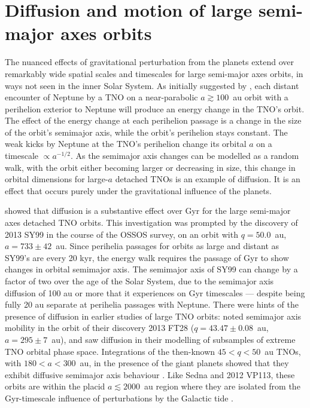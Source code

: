 \documentclass{aastex62}
\begin{document}
\section{Diffusion and motion of large semi-major axes orbits} \label{sec:diffusion}

The nuanced effects of gravitational perturbation from the planets extend over remarkably wide spatial scales and timescales for large semi-major axes orbits, in ways not seen in the inner Solar System.
As initially suggested by \citet{Duncan1987}, each distant encounter of Neptune by a TNO on a near-parabolic $a \gtrsim 100$~au orbit with a perihelion exterior to Neptune will produce an energy change in the TNO's orbit. 
The effect of the energy change at each perihelion passage is a change in the size of the orbit's semimajor axis, while the orbit's perihelion stays constant.
The weak kicks by Neptune at the TNO's perihelion change its orbital $a$ on a timescale $\propto a^{-1/2}$.
As the semimajor axis changes can be modelled as a random walk, with the orbit either becoming larger or decreasing in size, this change in orbital dimensions for large-$a$ detached TNOs is an example of diffusion.
It is an effect that occurs purely under the gravitational influence of the planets.

\citet{bannister17} showed that diffusion is a substantive effect over Gyr for the large semi-major axes detached TNO orbits.
This investigation was prompted by the discovery of 2013 SY99 in the course of the OSSOS survey, on an orbit with $q = 50.0$~au, $a = 733 \pm 42$~au.
Since perihelia passages for orbits as large and distant as SY99's are every 20 kyr, the energy walk requires the passage of Gyr to show changes in orbital semimajor axis.
The semimajor axis of SY99 can change by a factor of two over the age of the Solar System, due to the semimajor axis diffusion of 100 au or more that it experiences on Gyr timescales --- despite being fully 20 au separate at perihelia passages with Neptune.
There were hints of the presence of diffusion in earlier studies of large TNO orbits: \citet{sheppardtrujillo16} noted semimajor axis mobility in the orbit of their discovery 2013 FT28 ($q = 43.47 \pm 0.08$~au, $a = 295 \pm 7$~au), and \citet{gallardo12,brasserschwamb15} saw diffusion in their modelling of subsamples of extreme TNO orbital phase space.
Integrations of the then-known $45<q<50$~au TNOs, with $180 < a < 300$~au, in the presence of the giant planets showed that they exhibit diffusive semimajor axis behaviour \citep{bannister17}. 
Like Sedna and 2012 VP113, these orbits are within the placid $a \lesssim 2000$~au region where they are isolated from the Gyr-timescale influence of perturbations by the Galactic tide \citep{brasserschwamb15}.
\end{document}

